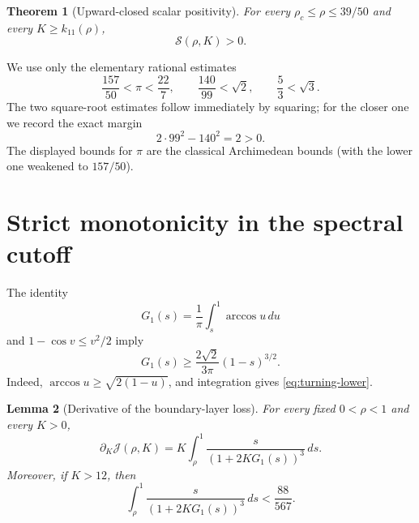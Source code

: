 \documentclass[11pt]{article}
\newtheorem{theorem}{Theorem}
\newtheorem{lemma}[theorem]{Lemma}
\theoremstyle{remark}
\begin{document}
\begin{theorem}[Upward-closed scalar positivity]
\label{thm:scalar-positive}
For every \(\rho_c\leq\rho\leq39/50\) and every
\(K\geq k_{11}(\rho)\),
\begin{equation}
 \boxed{\mathcal S(\rho,K)>0.}
 \label{eq:target}
\end{equation}
\end{theorem}

We use only the elementary rational estimates
\begin{equation}
 \frac{157}{50}<\pi<\frac{22}{7},
 \qquad
 \frac{140}{99}<\sqrt2,
 \qquad
 \frac53<\sqrt3.
 \label{eq:rational-constants}
\end{equation}
The two square-root estimates follow immediately by squaring; for the
closer one we record the exact margin
\[
 2\cdot99^2-140^2=2>0.
\]
The displayed bounds for \(\pi\) are the classical Archimedean bounds
(with the lower one weakened to \(157/50\)).

\section{Strict monotonicity in the spectral cutoff}

The identity
\begin{equation}
 G_1(s)=\frac1\pi\int_s^1\arccos u\,du
 \label{eq:G-integral}
\end{equation}
and \(1-\cos v\leq v^2/2\) imply
\begin{equation}
 G_1(s)\geq
 \frac{2\sqrt2}{3\pi}(1-s)^{3/2}.
 \label{eq:turning-lower}
\end{equation}
Indeed, \(\arccos u\geq\sqrt{2(1-u)}\), and integration gives
\eqref{eq:turning-lower}.

\begin{lemma}[Derivative of the boundary-layer loss]
\label{lem:J-derivative}
For every fixed \(0<\rho<1\) and every \(K>0\),
\begin{equation}
 \partial_K\mathcal J(\rho,K)
 =K\int_\rho^1
 \frac{s}{(1+2KG_1(s))^3}\,ds.
 \label{eq:J-derivative}
\end{equation}
Moreover, if \(K>12\), then
\begin{equation}
 \int_\rho^1
 \frac{s}{(1+2KG_1(s))^3}\,ds
 <\frac{88}{567}.
 \label{eq:cubic-loss}
\end{equation}
\end{lemma}
\end{document}
